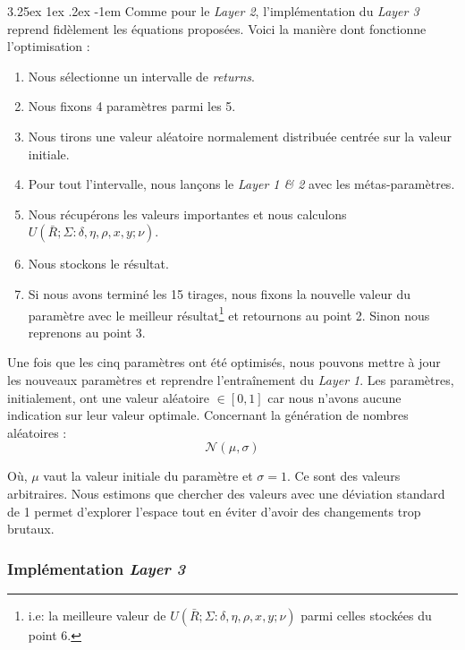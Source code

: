 \documentclass[a4paper, 11pt]{article}
\makeatletter
\renewcommand\paragraph{\@startsection{paragraph}{5}{\z@}%
  {3.25ex \@plus1ex \@minus.2ex}%
  {-1em}%
  {\normalfont\normalsize\bfseries}}
\makeatother
\begin{document}
\paragraph{}
Comme pour le \textit{Layer 2}, l'implémentation du \textit{Layer 3} reprend fidèlement les équations proposées. Voici la manière dont fonctionne
l'optimisation :
\begin{enumerate}
 \item Nous sélectionne un intervalle de \textit{returns}.
 \item Nous fixons 4 paramètres parmi les 5.
 \item Nous tirons une valeur aléatoire normalement distribuée centrée sur la valeur initiale.
 \item Pour tout l'intervalle, nous lançons le \textit{Layer 1 \& 2} avec les métas-paramètres.
 \item Nous récupérons les valeurs importantes et nous calculons $U(\bar{R};\Sigma : \delta, \eta, \rho, x, y; \nu)$.
 \item Nous stockons le résultat.
 \item Si nous avons terminé les 15 tirages, nous fixons la nouvelle valeur du paramètre avec le meilleur résultat\footnote{i.e: la meilleure valeur de 
 $U(\bar{R};\Sigma : \delta, \eta, \rho, x, y; \nu)$ parmi celles stockées du point 6.} et retournons au point 2. Sinon nous reprenons au point 3.
\end{enumerate}

Une fois que les cinq paramètres ont été optimisés, nous pouvons mettre à jour les nouveaux paramètres et reprendre l'entraînement du \textit{Layer 1}.
Les paramètres, initialement, ont une valeur aléatoire $\in [0,1]$ car nous n'avons aucune indication sur leur valeur optimale. Concernant la génération
de nombres aléatoires :
$$\mathcal{N}(\mu,\sigma)$$

Où, $\mu$ vaut la valeur initiale du paramètre et $\sigma = 1$. Ce sont des valeurs arbitraires. Nous estimons que chercher des valeurs avec une déviation
standard de 1 permet d'explorer l'espace tout en éviter d'avoir des changements trop brutaux.

\subsubsection{Implémentation \textit{Layer 3}}
\end{document}

